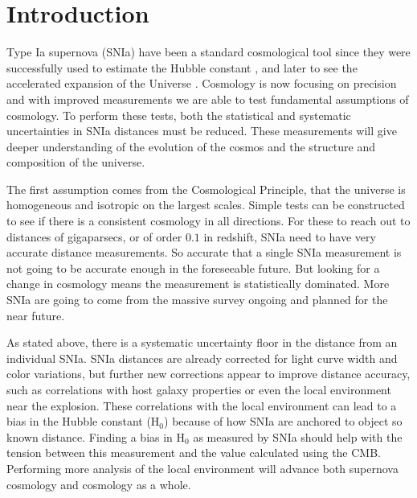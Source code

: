 \documentclass[apj, iop]{emulateapj}
\newcommand{\sn}{SNIa}
\newcommand{\Hubble}{\ensuremath{\text{H}_0}}
\begin{document}
\maketitle

\section{Introduction}\label{introduction} 

Type Ia supernova (\sn{}) have been a standard cosmological tool since they were
successfully used to estimate the Hubble constant \citep{Hamuy95,Riess95}, and
later to see the accelerated expansion of the Universe
\citep{Riess98,Perlmutter99}. Cosmology is now focusing on precision and with
improved measurements we are able to test fundamental assumptions of cosmology.
To perform these tests, both the statistical and systematic
uncertainties in \sn{} distances must be reduced. These measurements will give
deeper understanding of the evolution of the cosmos and the structure and
composition of the universe.

The first assumption comes from the Cosmological Principle, that the universe is
homogeneous and isotropic on the largest scales. Simple tests can be constructed
to see if there is a consistent cosmology in all directions. For these to reach
out to distances of gigaparsecs, or of order $0.1$ in redshift, \sn{} need to
have very accurate distance measurements. So accurate that a single \sn{}
measurement is not going to be accurate enough in the foreseeable future. But
looking for a change in cosmology means the measurement is statistically
dominated. More \sn{} are going to come from the massive survey ongoing and
planned for the near future.


As stated above, there is a systematic uncertainty floor in the distance from an
individual \sn{}. \sn{} distances are already corrected for light curve width
and color variations, but further new corrections appear to improve distance
accuracy, such as correlations with host galaxy properties or even the local
environment near the explosion. These correlations with the local environment
can lead to a bias in the Hubble constant (\Hubble{}) because of how \sn{} are
anchored to object so known distance. Finding a bias in \Hubble{} as measured by
\sn{} should help with the tension between this measurement and the value
calculated using the CMB. Performing more analysis of the local environment will
advance both supernova cosmology and cosmology as a whole.
\end{document}
